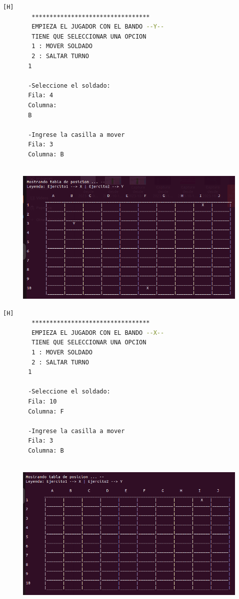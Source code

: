 \documentclass{article}
\begin{document}
	\begin{lstlisting}[language=bash,caption={Ejecucion:}][H]
		*********************************
		EMPIEZA EL JUGADOR CON EL BANDO --Y-- 
		TIENE QUE SELECCIONAR UNA OPCION
		1 : MOVER SOLDADO
		2 : SALTAR TURNO
	   1
	   
	   -Seleccione el soldado: 
	   Fila: 4
	   Columna: 
	   B
	   
	   -Ingrese la casilla a mover
	   Fila: 3
	   Columna: B
	   
	\end{lstlisting}
	\begin{figure}[H]
		\centering
		\includegraphics[width=1.0\textwidth,keepaspectratio]{img/Commit8.5.png}
	\end{figure}
	\begin{lstlisting}[language=bash,caption={Ejecucion:}][H]
		*********************************
		EMPIEZA EL JUGADOR CON EL BANDO --X-- 
		TIENE QUE SELECCIONAR UNA OPCION
		1 : MOVER SOLDADO
		2 : SALTAR TURNO
	   1
	   
	   -Seleccione el soldado: 
	   Fila: 10
	   Columna: F
	   
	   -Ingrese la casilla a mover
	   Fila: 3
	   Columna: B
	   	   
	\end{lstlisting}
	\begin{figure}[H]
		\centering
		\includegraphics[width=1.0\textwidth,keepaspectratio]{img/Commit8.6.png}
	\end{figure}
\end{document}
